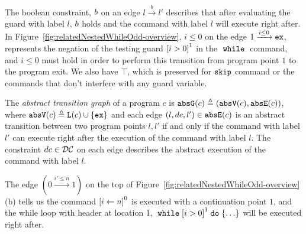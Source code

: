 The boolean constraint, $b$ on an edge $l \xrightarrow{b} l'$ describes
that after evaluating the guard with label $l$,
$b$ holds and the command with label $l$ will execute right after.
In Figure~\ref{fig:relatedNestedWhileOdd-overview}, $i \leq 0 $ on the edge $1 \xrightarrow{i \leq 0} \mathtt{ex}$, 
represents the negation of the testing guard $\clabel{i > 0}^1$
in the $\;\mathtt{while}\;$ command, and $i \leq 0$ must hold in order to perform this transition from program point $1$ to
the program exit. 
We also have $\top$, which is preserved for $\mathtt{skip}$ command or the commands that don't interfere with any guard variable.



\begin{defn}
 \label{def:abs_cfg}
 The \emph{abstract transition graph} of a program $c$ is $\mathtt{abs}{\mathtt{G}}(c) \triangleq (\mathtt{abs}{\mathtt{V}}(c), \mathtt{abs}{\mathtt{E}}(c))$, where
 $\mathtt{abs}{\mathtt{V}}(c) \triangleq \mathtt{L}(c)\cup\{\mathtt{ex}\}$
 and 
 each edge $(l, dc, l') \in \mathtt{abs}{\mathtt{E}}(c)$ is an abstract transition
between two program points $l, l'$ if and only if
the command with label $l'$ can execute right after the execution of the command with label $l$.
The constraint $dc \in \mathcal{DC}$ on each edge
describes the abstract execution of the command with label $l$.
\end{defn}
The edge $(0 \xrightarrow{i' \leq n} 1)$ on the top of Figure~\ref{fig:relatedNestedWhileOdd-overview}(b) tells us the command 
$\clabel{\assign{i}{n}}^0$ is executed with a continuation point $1$, and the while loop with header at location $1$, $\ewhile \clabel{i > 0}^1 \edo \{\ldots\}$ will be executed right after.

